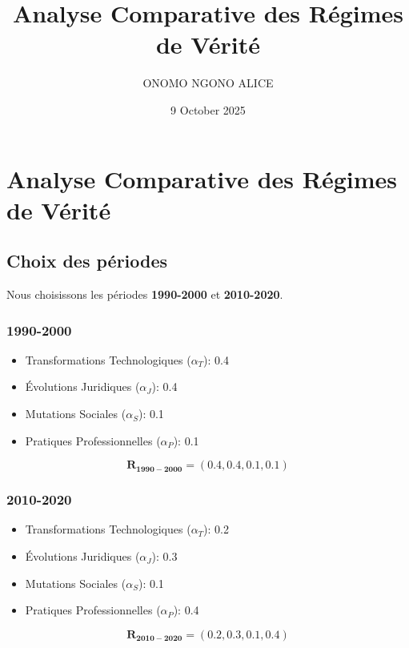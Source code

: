 \documentclass{article}
\title{Analyse Comparative des Régimes de Vérité}
\author{ONOMO NGONO ALICE}
\date{9 October 2025} %
\begin{document}
\maketitle

\section{Analyse Comparative des Régimes de Vérité}

\subsection{Choix des périodes}
Nous choisissons les périodes \textbf{1990-2000} et \textbf{2010-2020}.
\subsubsection{1990-2000}
\begin{itemize}
    \item Transformations Technologiques (\( \alpha_T \)): 0.4
    \item Évolutions Juridiques (\( \alpha_J \)): 0.4
    \item Mutations Sociales (\( \alpha_S \)): 0.1
    \item Pratiques Professionnelles (\( \alpha_P \)): 0.1
\end{itemize}
\[
\mathbf{R_{1990-2000}} = (0.4, 0.4, 0.1, 0.1)
\]

\subsubsection{2010-2020}
\begin{itemize}
    \item Transformations Technologiques (\( \alpha_T \)): 0.2
    \item Évolutions Juridiques (\( \alpha_J \)): 0.3
    \item Mutations Sociales (\( \alpha_S \)): 0.1
    \item Pratiques Professionnelles (\( \alpha_P \)): 0.4
\end{itemize}
\[
\mathbf{R_{2010-2020}} = (0.2, 0.3, 0.1, 0.4)
\]
\end{document}
